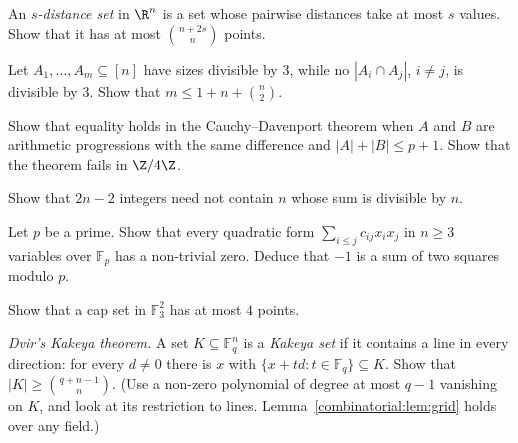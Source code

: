 \begin{exercise}[$\star\star$]\label{combinatorial:ex:sdistance}
An \emph{$s$-distance set} in $\R^n$ is a set whose pairwise distances take at most $s$ values. Show that it has at most $\binom{n+2s}{n}$ points.
\end{exercise}

\begin{exercise}[$\star$]\label{combinatorial:ex:fwmodthree}
Let $A_1,\dots,A_m\subseteq[n]$ have sizes divisible by $3$, while no $|A_i\cap A_j|$, $i\ne j$, is divisible by $3$. Show that $m\le1+n+\binom n2$.
\end{exercise}

\begin{exercise}[$\star$]\label{combinatorial:ex:cdsharp}
Show that equality holds in the Cauchy--Davenport theorem when $A$ and $B$ are arithmetic progressions with the same difference and $|A|+|B|\le p+1$. Show that the theorem fails in $\Z/4\Z$.
\end{exercise}

\begin{exercise}[$\star$]\label{combinatorial:ex:egzsharp}
Show that $2n-2$ integers need not contain $n$ whose sum is divisible by $n$.
\end{exercise}

\begin{exercise}[$\star\star$]\label{combinatorial:ex:quadric}
Let $p$ be a prime. Show that every quadratic form $\sum_{i\le j}c_{ij}x_ix_j$ in $n\ge3$ variables over $\mathbb F_p$ has a non-trivial zero. Deduce that $-1$ is a sum of two squares modulo $p$.
\end{exercise}

\begin{exercise}[$\star\star$]\label{combinatorial:ex:capplane}
Show that a cap set in $\mathbb F_3^2$ has at most $4$ points.
\end{exercise}

\begin{exercise}[$\star\star\star$]\label{combinatorial:ex:dvir}
\emph{Dvir's Kakeya theorem.} A set $K\subseteq\mathbb F_q^n$ is a \emph{Kakeya set} if it contains a line in every direction: for every $d\ne0$ there is $x$ with $\{x+td:t\in\mathbb F_q\}\subseteq K$. Show that
$|K|\ge\binom{q+n-1}n$. (Use a non-zero polynomial of degree at most $q-1$ vanishing on $K$, and look at its restriction to lines. Lemma~\ref{combinatorial:lem:grid} holds over any field.)
\end{exercise}

